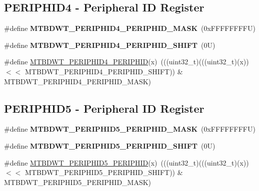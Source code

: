 \subsection*{P\+E\+R\+I\+P\+H\+I\+D4 -\/ Peripheral ID Register}
\begin{DoxyCompactItemize}
\item 
\mbox{\label{group___m_t_b___register___masks_gaddd57001bd456b2dd9720666e79a6a9e}} 
\#define {\bfseries M\+T\+B\+D\+W\+T\+\_\+\+P\+E\+R\+I\+P\+H\+I\+D4\+\_\+\+P\+E\+R\+I\+P\+H\+I\+D\+\_\+\+M\+A\+SK}~(0x\+F\+F\+F\+F\+F\+F\+F\+F\+U)
\item 
\mbox{\label{group___m_t_b___register___masks_gae4c40c829668a2b26905df906a978e6a}} 
\#define {\bfseries M\+T\+B\+D\+W\+T\+\_\+\+P\+E\+R\+I\+P\+H\+I\+D4\+\_\+\+P\+E\+R\+I\+P\+H\+I\+D\+\_\+\+S\+H\+I\+FT}~(0\+U)
\item 
\#define \mbox{\hyperlink{group___m_t_b___register___masks_gafedb60fc72cfa242897fccc521c0ba14}{M\+T\+B\+D\+W\+T\+\_\+\+P\+E\+R\+I\+P\+H\+I\+D4\+\_\+\+P\+E\+R\+I\+P\+H\+ID}}(x)~(((uint32\+\_\+t)(((uint32\+\_\+t)(x)) $<$$<$ M\+T\+B\+D\+W\+T\+\_\+\+P\+E\+R\+I\+P\+H\+I\+D4\+\_\+\+P\+E\+R\+I\+P\+H\+I\+D\+\_\+\+S\+H\+I\+FT)) \& M\+T\+B\+D\+W\+T\+\_\+\+P\+E\+R\+I\+P\+H\+I\+D4\+\_\+\+P\+E\+R\+I\+P\+H\+I\+D\+\_\+\+M\+A\+SK)
\end{DoxyCompactItemize}
\subsection*{P\+E\+R\+I\+P\+H\+I\+D5 -\/ Peripheral ID Register}
\begin{DoxyCompactItemize}
\item 
\mbox{\label{group___m_t_b___register___masks_ga762d50a2531fdd0962d4736b7e783948}} 
\#define {\bfseries M\+T\+B\+D\+W\+T\+\_\+\+P\+E\+R\+I\+P\+H\+I\+D5\+\_\+\+P\+E\+R\+I\+P\+H\+I\+D\+\_\+\+M\+A\+SK}~(0x\+F\+F\+F\+F\+F\+F\+F\+F\+U)
\item 
\mbox{\label{group___m_t_b___register___masks_ga2e250362846de59fcb486266647ec7e8}} 
\#define {\bfseries M\+T\+B\+D\+W\+T\+\_\+\+P\+E\+R\+I\+P\+H\+I\+D5\+\_\+\+P\+E\+R\+I\+P\+H\+I\+D\+\_\+\+S\+H\+I\+FT}~(0\+U)
\item 
\#define \mbox{\hyperlink{group___m_t_b___register___masks_ga48edb015bd6c166b7195ec0e02d8cb7d}{M\+T\+B\+D\+W\+T\+\_\+\+P\+E\+R\+I\+P\+H\+I\+D5\+\_\+\+P\+E\+R\+I\+P\+H\+ID}}(x)~(((uint32\+\_\+t)(((uint32\+\_\+t)(x)) $<$$<$ M\+T\+B\+D\+W\+T\+\_\+\+P\+E\+R\+I\+P\+H\+I\+D5\+\_\+\+P\+E\+R\+I\+P\+H\+I\+D\+\_\+\+S\+H\+I\+FT)) \& M\+T\+B\+D\+W\+T\+\_\+\+P\+E\+R\+I\+P\+H\+I\+D5\+\_\+\+P\+E\+R\+I\+P\+H\+I\+D\+\_\+\+M\+A\+SK)
\end{DoxyCompactItemize}
